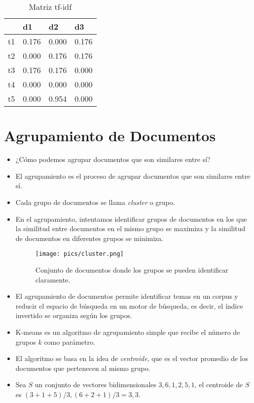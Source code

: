  \begin{table}[htbp]
 \centering
\begin{tabular}{|l|r|r|r|}
\hline
 & \multicolumn{1}{l|}{d1} & \multicolumn{1}{l|}{d2} & \multicolumn{1}{l|}{d3} \\ \hline
t1 & 0.176 & 0.000 & 0.176 \\ \hline
t2 & 0.000 & 0.176 & 0.176 \\ \hline
t3 & 0.176 & 0.176 & 0.000 \\ \hline
t4 & 0.000 & 0.000 & 0.000 \\ \hline
t5 & 0.000 & 0.954 & 0.000 \\ \hline
\end{tabular}
\caption{Matriz tf-idf}
\end{table}

\section{Agrupamiento de Documentos}

\begin{itemize}
\item ¿Cómo podemos agrupar documentos que son similares entre sí?
\item El agrupamiento es el proceso de agrupar documentos que son similares entre sí.
\item Cada grupo de documentos se llama \emph{cluster} o grupo.
\item En el agrupamiento, intentamos identificar grupos de documentos en los que la similitud entre documentos en el mismo grupo se maximiza y la similitud de documentos en diferentes grupos se minimiza.
\begin{figure}[h!]
\centering
\texttt{[image: pics/cluster.png]}
\caption{ Conjunto de documentos donde los grupos se pueden identificar claramente.}
\end{figure}
\item El agrupamiento de documentos permite identificar temas en un corpus y reducir el espacio de búsqueda en un motor de búsqueda, es decir, el índice invertido se organiza según los grupos.
\item K-means es un algoritmo de agrupamiento simple que recibe el número de grupos $k$ como parámetro.
\item El algoritmo se basa en la idea de \emph{centroide}, que es el vector promedio de los documentos que pertenecen al mismo grupo.
\item Sea $S$ un conjunto de vectores bidimensionales ${3,6}, {1,2}, {5,1}$, el centroide de $S$ es ${(3+1+5)/3,(6+2+1)/3} = {3,3}$.

\end{itemize}

